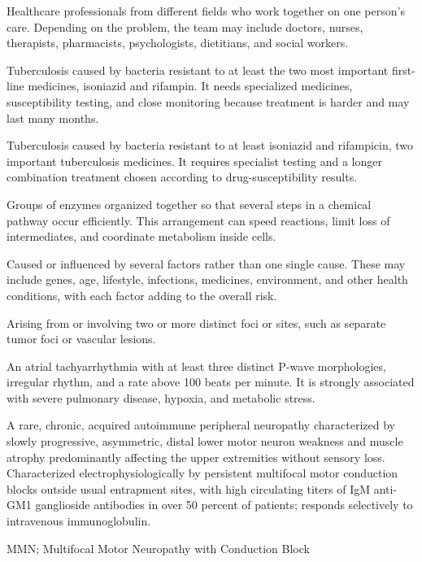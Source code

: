  Healthcare professionals from different fields who work together on one person's care. Depending on the problem, the team may include doctors, nurses, therapists, pharmacists, psychologists, dietitians, and social workers.

 Tuberculosis caused by bacteria resistant to at least the two most important first-line medicines, isoniazid and rifampin. It needs specialized medicines, susceptibility testing, and close monitoring because treatment is harder and may last many months.

 Tuberculosis caused by bacteria resistant to at least isoniazid and rifampicin, two important tuberculosis medicines. It requires specialist testing and a longer combination treatment chosen according to drug-susceptibility results.

 Groups of enzymes organized together so that several steps in a chemical pathway occur efficiently. This arrangement can speed reactions, limit loss of intermediates, and coordinate metabolism inside cells.

 Caused or influenced by several factors rather than one single cause. These may include genes, age, lifestyle, infections, medicines, environment, and other health conditions, with each factor adding to the overall risk.

 Arising from or involving two or more distinct foci or sites, such as separate tumor foci or vascular lesions.

 An atrial tachyarrhythmia with at least three distinct P-wave morphologies, irregular
rhythm, and a rate above 100 beats per minute. It is strongly associated with severe
pulmonary disease, hypoxia, and metabolic stress.

 A rare, chronic, acquired autoimmune peripheral neuropathy characterized by slowly progressive, asymmetric, distal lower motor neuron weakness and muscle atrophy predominantly affecting the upper extremities without sensory loss. Characterized electrophysiologically by persistent multifocal motor conduction blocks outside usual entrapment sites, with high circulating titers of IgM anti-GM1 ganglioside antibodies in over 50 percent of patients; responds selectively to intravenous immunoglobulin.

\synonyms
MMN; Multifocal Motor Neuropathy with Conduction Block

